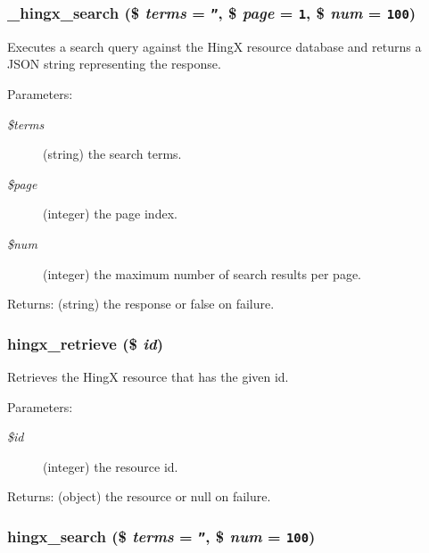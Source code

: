 \subsubsection{\setlength{\rightskip}{0pt plus 5cm}\_\-hingx\_\-search (\$ {\em terms} = {\tt ''}, \$ {\em page} = {\tt 1}, \$ {\em num} = {\tt 100})}\label{hingx_8inc_57e483cf1c1d3b9295db8843dc451a7a}


Executes a search query against the Hing\-X resource database and returns a JSON string representing the response. 

\begin{Desc}
\item[Parameters:]
\begin{description}
\item[{\em \$terms}](string) the search terms. \item[{\em \$page}](integer) the page index. \item[{\em \$num}](integer) the maximum number of search results per page. \end{description}
\end{Desc}
\begin{Desc}
\item[Returns:](string) the response or false on failure. \end{Desc}
\subsubsection{\setlength{\rightskip}{0pt plus 5cm}hingx\_\-retrieve (\$ {\em id})}\label{hingx_8inc_331f72c6e4b7c4797c87aacba5777469}


Retrieves the Hing\-X resource that has the given id. 

\begin{Desc}
\item[Parameters:]
\begin{description}
\item[{\em \$id}](integer) the resource id. \end{description}
\end{Desc}
\begin{Desc}
\item[Returns:](object) the resource or null on failure. \end{Desc}
\subsubsection{\setlength{\rightskip}{0pt plus 5cm}hingx\_\-search (\$ {\em terms} = {\tt ''}, \$ {\em num} = {\tt 100})}\label{hingx_8inc_28aaa6768ad18317af6563303987d9fe}


